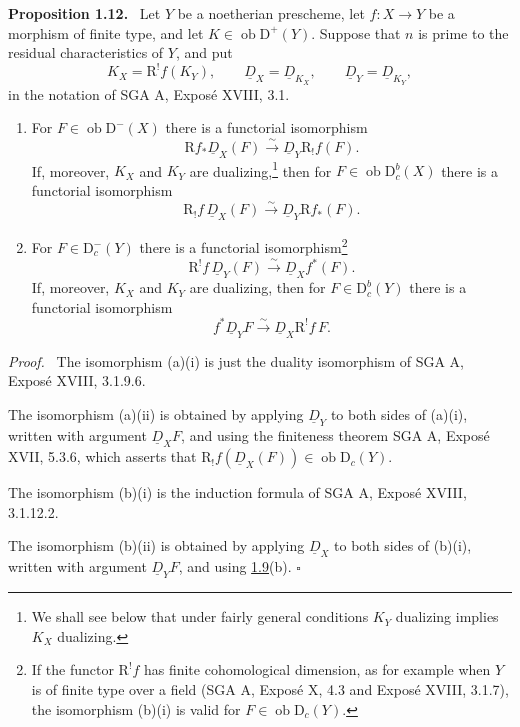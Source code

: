 \documentclass[11pt]{article}
\providecommand{\qedtext}{\hfill$\square$}
\newenvironment{statement}[1]{\par\medskip\noindent\textbf{#1.}\ }{\par\medskip}
\newenvironment{prooftext}[1][Proof]{\par\noindent\emph{#1.}\ }{\par\medskip}
\newcommand{\R}{\mathrm{R}}
\newcommand{\D}{\mathrm{D}}
\newcommand{\ob}{\operatorname{ob}}
\providecommand{\ob}{\operatorname{ob}}
\providecommand{\R}{\mathrm R}
\providecommand{\qedtext}{\hfill$\square$}
\begin{document}
\label{sga5:I:proposition:1.12}\begin{statement}{Proposition 1.12}
Let $Y$ be a noetherian prescheme, let $f:X\to Y$ be a morphism of finite type, and let $K\in\ob\D^+(Y)$. Suppose that $n$ is prime to the residual characteristics of $Y$, and put
\[
   K_X=\R^!f(K_Y),\qquad \underline D_X=\underline D_{K_X},\qquad \underline D_Y=\underline D_{K_Y},
\]
in the notation of SGA A, Exposé XVIII, 3.1.
\begin{enumerate}[label=\alph*)]
\item For $F\in\ob\D^-(X)$ there is a functorial isomorphism
\begin{equation}
\R f_*\underline D_X(F)\xrightarrow{\sim}\underline D_Y\R_!f(F).\tag{i}\label{sga5:I:equation:i}
\end{equation}
If, moreover, $K_X$ and $K_Y$ are dualizing,\footnote{We shall see below that under fairly general conditions $K_Y$ dualizing implies $K_X$ dualizing.} then for $F\in\ob\D_c^b(X)$ there is a functorial isomorphism
\begin{equation}
\R_!f\,\underline D_X(F)\xrightarrow{\sim}\underline D_Y\R f_*(F).\tag{ii}\label{sga5:I:equation:ii}
\end{equation}

\item For $F\in\D_c^-(Y)$ there is a functorial isomorphism\footnote{If the functor $\R^!f$ has finite cohomological dimension, as for example when $Y$ is of finite type over a field (SGA A, Exposé X, 4.3 and Exposé XVIII, 3.1.7), the isomorphism (b)(i) is valid for $F\in\ob\D_c(Y)$.}
\begin{equation}
\R^!f\,\underline D_Y(F)\xrightarrow{\sim}\underline D_X f^*(F).\tag{i}\label{sga5:I:equation:i:2}
\end{equation}
If, moreover, $K_X$ and $K_Y$ are dualizing, then for $F\in\D_c^b(Y)$ there is a functorial isomorphism
\begin{equation}
f^*\underline D_YF\xrightarrow{\sim}\underline D_X\R^!f\,F.\tag{ii}\label{sga5:I:equation:ii:2}
\end{equation}
\end{enumerate}
\end{statement}

\begin{prooftext}
The isomorphism (a)(i) is just the duality isomorphism of SGA A, Exposé XVIII, 3.1.9.6.

The isomorphism (a)(ii) is obtained by applying $\underline D_Y$ to both sides of (a)(i), written with argument $\underline D_XF$, and using the finiteness theorem SGA A, Exposé XVII, 5.3.6, which asserts that $\R_!f(\underline D_X(F))\in\ob\D_c(Y)$.

The isomorphism (b)(i) is the induction formula of SGA A, Exposé XVIII, 3.1.12.2.

The isomorphism (b)(ii) is obtained by applying $\underline D_X$ to both sides of (b)(i), written with argument $\underline D_YF$, and using \hyperref[sga5:I:lemma:1.9]{1.9}(b). \qedtext
\end{prooftext}
\end{document}
